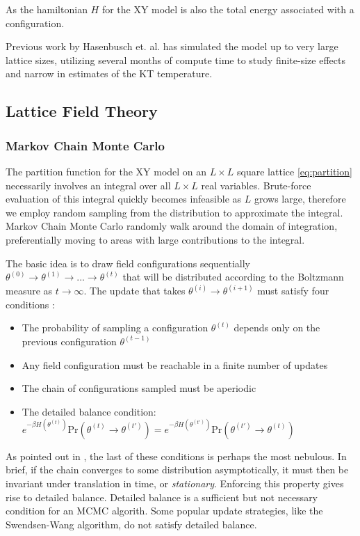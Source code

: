 \documentclass[12pt]{article}
\begin{document}
As the hamiltonian $H$ for the XY model is also the total energy associated with a configuration.

Previous work by Hasenbusch et. al. \cite{Hasenbusch_2005} has simulated the model up to very large lattice sizes, utilizing several months of compute
time to study finite-size effects and narrow in estimates of the KT temperature. 

\subsection{Lattice Field Theory}

\subsubsection{Markov Chain Monte Carlo}

The partition function for the XY model on an $L\times L$ square lattice \ref{eq:partition} necessarily involves an integral over all $L\times L$ real variables.
Brute-force evaluation of this integral quickly becomes infeasible as $L$ grows large, therefore we employ random sampling from the distribution to approximate
the integral. Markov Chain Monte Carlo randomly walk around the domain of integration, preferentially moving to areas with large contributions to the integral.

The basic idea is to draw field configurations sequentially $\theta^{(0)} \rightarrow \theta^{(1)} \rightarrow ... \rightarrow \theta^{(t)}$ that will be
distributed according to the Boltzmann measure as $t\rightarrow\infty$. The update that takes $\theta^{(i)}\rightarrow\theta^{(i+1)}$ must satisfy four conditions \cite{hanada2018markovchainmontecarlo}:

\begin{itemize}
	\item The probability of sampling a configuration $\theta^{(t)}$ depends only on the previous configuration $\theta^{(t-1)}$
	\item Any field configuration must be reachable in a finite number of updates
	\item The chain of configurations sampled must be aperiodic
	\item The detailed balance condition: $e^{-\beta H(\theta^{(t)})}\text{Pr}(\theta^{(t)}\rightarrow\theta^{(t')})=e^{-\beta H(\theta^{(t')})}\text{Pr}(\theta^{(t')}\rightarrow\theta^{(t)})$
\end{itemize}

As pointed out in \cite{hanada2018markovchainmontecarlo}, the last of these conditions is perhaps the most nebulous. In brief, if the chain converges to some
distribution asymptotically, it must then be invariant under translation in time, or \textit{stationary}. Enforcing this property gives rise to detailed balance.
Detailed balance is a sufficient but not necessary condition for an MCMC algorith. Some popular update strategies, like the Swendsen-Wang algorithm, do not
satisfy detailed balance.
\end{document}
